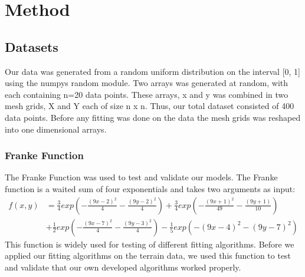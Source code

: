 \section{Method}




\subsection{Datasets}
Our data was generated from a random uniform distribution on the interval [0,
1] using the numpys random module. Two arrays was generated at random, with each containing n=20 data points. 
These arrays, x and y was combined in two mesh grids, X and Y each of size n x n. Thus, our
total dataset consisted of 400 data points. Before any fitting was done on the
data the mesh grids was reshaped into one dimensional arrays.  

\subsubsection{Franke Function}

The Franke Function was used to test and validate our models.
The Franke function is a waited sum of four exponentials and takes two
arguments as input: 
\begin{align}
    \label{eq:franke_function} 
    f(x,y) &= \frac{3}{4}exp\left(-\frac{(9x-2)^2}{4}-\frac{(9y-2)^2}{4} \right)
    + \frac{3}{4}exp\left(-\frac{(9x+1)^2}{49}-\frac{(9y+1)}{10} \right) \\
           &+ \frac{1}{2}exp\left(-\frac{(9x-7)^2}{4}-\frac{(9y-3)^2}{4}
           \right)-\frac{1}{5}exp(-(9x-4)^2-(9y-7)^2)
\end{align}
This function is widely used for testing of different fitting algorithms. 
Before we applied our fitting algorithms on the terrain data, we used this function
to test and validate that our own developed algorithms worked properly.    

